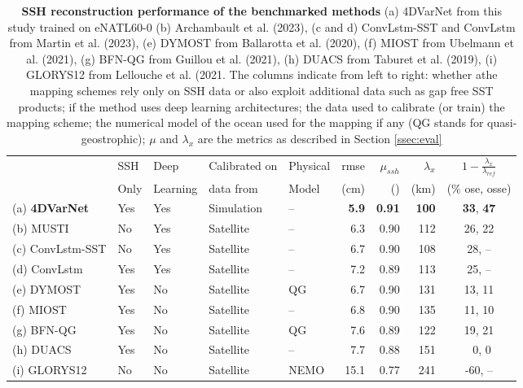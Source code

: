 \begin{bibunit}
\begin{table}[h]
\hspace{-10mm}\begin{tabular}{l||llll|rrrc}
\toprule
 & SSH  & Deep  & Calibrated on  & Physical  & rmse & $\mu_{ssh}$  & $\lambda_x$ & $1 - \frac{\lambda_x}{\lambda_{ref}}$ \\
 &  Only &  Learning &  data from &  Model &  (cm) &  () &  (km) & (\% ose, osse) \\
\midrule
(a) \textbf{4DVarNet} &  Yes & Yes & Simulation  & -- & \textbf{5.9}  & \textbf{0.91}  & \textbf{100} & \textbf{33}, \textbf{47} \\
(b) MUSTI & No &  Yes & Satellite  & -- & 6.3  & 0.90  & 112 & 26, 22 \\
(c) ConvLstm-SST & No &  Yes & Satellite  & -- & 6.7  & 0.90  & 108 & 28, -- \\
(d) ConvLstm &  Yes &  Yes & Satellite  & -- & 7.2  & 0.89  & 113 & 25, -- \\
(e) DYMOST&  Yes & No & Satellite  & QG & 6.7  & 0.90  & 131 & 13, 11 \\
(f) MIOST &  Yes & No & Satellite  & -- & 6.8  & 0.90  & 135 & 11, 10 \\
(g) BFN-QG &  Yes & No & Satellite  & QG & 7.6  & 0.89  & 122 & 19, 21 \\
(h) DUACS &  Yes & No & Satellite  & -- & 7.7  & 0.88  & 151 &  ~0,  0 \\
(i) GLORYS12 & No & No & Satellite  & NEMO & 15.1  & 0.77  & 241 & -60, -- \\
\bottomrule
\end{tabular}
\caption{ \textbf{SSH reconstruction performance of the benchmarked methods} (a) 4DVarNet from this study trained on eNATL60-0 (b) Archambault et al. (2023), (c and d)
ConvLstm-SST and ConvLstm from Martin et al. (2023), (e) DYMOST from Ballarotta
et al. (2020), (f) MIOST from Ubelmann et al. (2021), (g) BFN-QG from Guillou et
al. (2021), (h) DUACS from Taburet et al. (2019), (i) GLORYS12 from Lellouche et al.
(2021. The columns indicate from left to right: whether athe mapping schemes rely only on SSH data or also exploit additional data such as gap free SST products; if the method uses deep learning architectures; the data used to calibrate (or train) the mapping scheme; the numerical model of the ocean used for the mapping if any (QG stands for quasi-geostrophic); $\mu$ and $\lambda_x$ are the metrics as described in Section \ref{ssec:eval}}
\label{tab:bench}
\end{table}




\end{bibunit}
